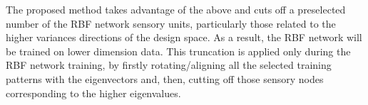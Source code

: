 The proposed method takes advantage of the above and cuts off a preselected number of the RBF network sensory units, particularly those related to the higher variances directions of the design space. As a result, the RBF network will be trained on lower dimension data. 
This truncation is applied only during the RBF network training, by firstly rotating/aligning all the selected training patterns with the eigenvectors and, then, cutting off those sensory nodes corresponding to the higher eigenvalues. 
    
    
    

